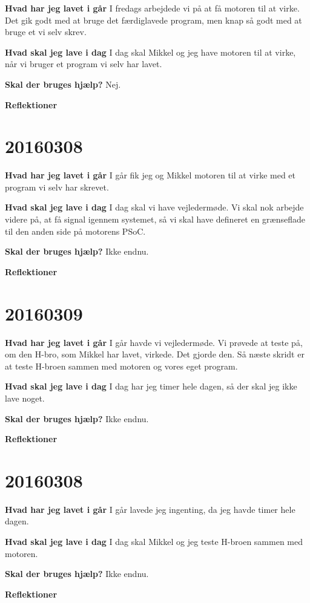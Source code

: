 \documentclass{article}
\begin{document}
	\textbf{Hvad har jeg lavet i går}
	I fredags arbejdede vi på at få motoren til at virke. Det gik godt med at bruge det færdiglavede program, men knap så godt med at bruge et vi selv skrev. 
	
	\textbf{Hvad skal jeg lave i dag}
	I dag skal Mikkel og jeg have motoren til at virke, når vi bruger et program vi selv har lavet. 
	
	\textbf{Skal der bruges hjælp?}
	Nej. 
	
	\textbf{Reflektioner}
	
	\section{20160308}
	
	\textbf{Hvad har jeg lavet i går}
	I går fik jeg og Mikkel motoren til at virke med et program vi selv har skrevet. 
	
	\textbf{Hvad skal jeg lave i dag}
	I dag skal vi have vejledermøde. Vi skal nok arbejde videre på, at få signal igennem systemet, så vi skal have defineret en grænseflade til den anden side på motorens PSoC. 
	
	\textbf{Skal der bruges hjælp?}
	Ikke endnu. 
	
	\textbf{Reflektioner}

	\section{20160309}
	
	\textbf{Hvad har jeg lavet i går}
	I går havde vi vejledermøde. Vi prøvede at teste på, om den H-bro, som Mikkel har lavet, virkede. Det gjorde den. Så næste skridt er at teste H-broen sammen med motoren og vores eget program.  
	
	\textbf{Hvad skal jeg lave i dag}
	I dag har jeg timer hele dagen, så der skal jeg ikke lave noget. 
	
	\textbf{Skal der bruges hjælp?}
	Ikke endnu. 
	
	\textbf{Reflektioner}	
	
	\section{20160308}
	
	\textbf{Hvad har jeg lavet i går}
	I går lavede jeg ingenting, da jeg havde timer hele dagen.  
	
	\textbf{Hvad skal jeg lave i dag}
	I dag skal Mikkel og jeg teste H-broen sammen med motoren. 
	
	\textbf{Skal der bruges hjælp?}
	Ikke endnu. 
	
	\textbf{Reflektioner}
\end{document}
